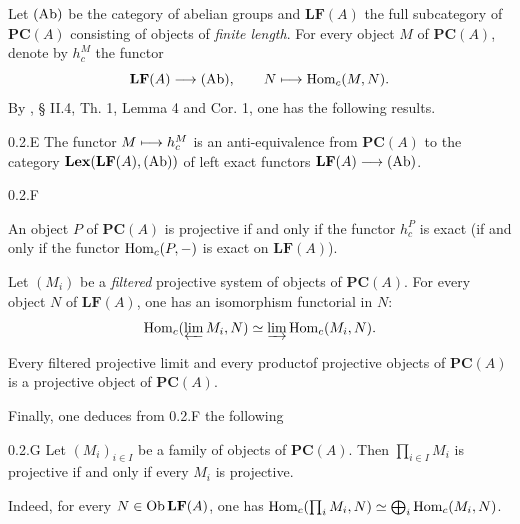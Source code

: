 Let $\textup{(Ab)}$ be the category of abelian groups and $\mathbf{LF}(A)$ the full subcategory of $\mathbf{PC}(A)$ consisting of objects of \emph{finite length}. For every object $M$ of $\mathbf{PC}(A)$, denote by $h_c^M$ the functor
\[
\mathbf{LF}(A)\longrightarrow\textup{(Ab)},\qquad N\longmapsto\operatorname{Hom}_c(M,N).
\]
By \cite{CA}, § II.4, Th. 1, Lemma 4 and Cor. 1, one has the following results.

\begin{proposition}{0.2.E}\label{VIIB.0.2.E}
The functor $M\longmapsto h_c^M$ is an anti-equivalence from $\mathbf{PC}(A)$ to the category $\mathbf{Lex}(\mathbf{LF}(A),\textup{(Ab)})$ of left exact functors $\mathbf{LF}(A)\longrightarrow\textup{(Ab)}$.
\end{proposition}
\begin{corollary}{0.2.F}\label{VIIB.0.2.F}
\begin{enumeratei}
\item An object $P$ of $\mathbf{PC}(A)$ is projective if and only if the functor $h_c^P$ is exact (\ie if and only if the functor $\operatorname{Hom}_c(P,-)$ is exact on $\mathbf{LF}(A)$).
\item Let $(M_i)$ be a \emph{filtered} projective system of objects of $\mathbf{PC}(A)$. For every object $N$ of $\mathbf{LF}(A)$, one has an isomorphism functorial in $N$:
\[
\operatorname{Hom}_c(\varprojlim M_i,N)\simeq\varinjlim\operatorname{Hom}_c(M_i,N).
\]
\item Every filtered projective limit and every product\footnotemark[12] of projective objects of $\mathbf{PC}(A)$ is a projective object of $\mathbf{PC}(A)$.
\end{enumeratei}
\end{corollary}
Finally, one deduces from 0.2.F the following
\begin{corollary}{0.2.G}\label{VIIB.0.2.G}
Let $(M_i)_{i\in I}$ be a family of objects of $\mathbf{PC}(A)$. Then $\prod_{i\in I}M_i$ is projective if and only if every $M_i$ is projective.
\end{corollary}
Indeed, for every $N\in\operatorname{Ob}\mathbf{LF}(A)$, one has $\operatorname{Hom}_c(\prod_i M_i,N)\simeq\bigoplus_i\operatorname{Hom}_c(M_i,N)$.

